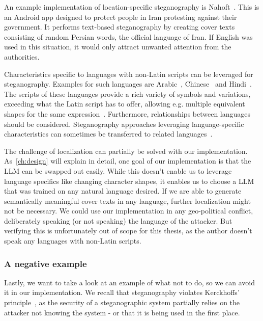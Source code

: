 An example implementation of location-specific steganography is Nahoft~\cite{united4iranNahoft2021,united4iranU4iadminNahoft2025}. This is an Android app designed to protect people in Iran protesting against their government. It performs text-based steganography by creating cover texts consisting of random Persian words, the official language of Iran. If English was used in this situation, it would only attract unwanted attention from the authorities.

Characteristics specific to languages with non-Latin scripts can be leveraged for steganography. Examples for such languages are Arabic~\cite{shirali-shahrezaNewApproachPersian2006,hamzahLinguisticSteganographyFramework2021,thabitComparativeAnalysisArabic2021}, Chinese~\cite{luoTextSteganographyHigh2017} and Hindi~\cite{allaEvolutionHindiText2009}. The scripts of these languages provide a rich variety of symbols and variations, exceeding what the Latin script has to offer, allowing e.g. multiple equivalent shapes for the same expression~\cite{shirali-shahrezaNewApproachPersian2006,hamzahLinguisticSteganographyFramework2021,thabitComparativeAnalysisArabic2021}. Furthermore, relationships between languages should be considered. Steganography approaches leveraging language-specific characteristics can sometimes be transferred to related languages~\cite{allaEvolutionHindiText2009}.

The challenge of localization can partially be solved with our implementation. As~\cref{ch:design} will explain in detail, one goal of our implementation is that the \gls{LLM} can be swapped out easily. While this doesn't enable us to leverage language specifics like changing character shapes, it enables us to choose a \gls{LLM} that was trained on any natural language desired. If we are able to generate semantically meaningful cover texts in any language, further localization might not be necessary. We could use our implementation in any geo-political conflict, deliberately speaking (or not speaking) the language of the attacker. But verifying this is unfortunately out of scope for this thesis, as the author doesn't speak any languages with non-Latin scripts.

\subsubsection{A negative example}
\label{sec:aNegativeExample}
Lastly, we want to take a look at an example of what not to do, so we can avoid it in our implementation. We recall that steganography violates Kerckhoffs' principle~\cite{andersonLimitsSteganography1998}, as the security of a steganographic system partially relies on the attacker not knowing the system - or that it is being used in the first place.

